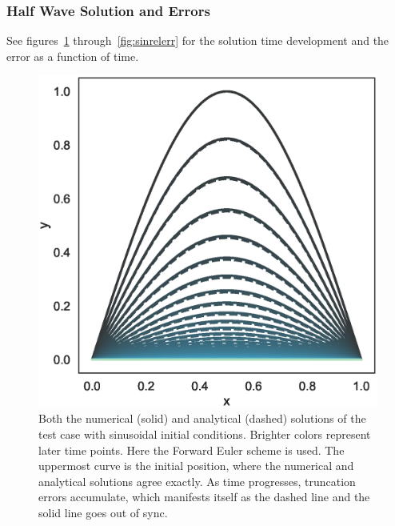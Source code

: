 \documentclass[aps,reprint]{revtex4-1}
\begin{document}
\subsubsection{Half Wave Solution and Errors}
See figures~\ref{fig:sinnumanalytic} through~\ref{fig:sinrelerr} for the solution
time development and the error as a function of time.
\begin{figure}[ht]
  \centering
  \includegraphics[width=\columnwidth]{figures/sin_numeric_vs_analytical.eps}
  \caption{\label{fig:sinnumanalytic} Both the numerical (solid) and analytical
    (dashed) solutions of the test case with
    sinusoidal initial conditions. Brighter colors represent later time points.
    Here the Forward Euler scheme is used.
  The uppermost curve is the initial position, where the numerical and
  analytical solutions agree exactly. As time progresses, truncation errors
  accumulate, which manifests itself as the dashed line and the solid line goes
  out of sync.}
\end{figure}
\end{document}
